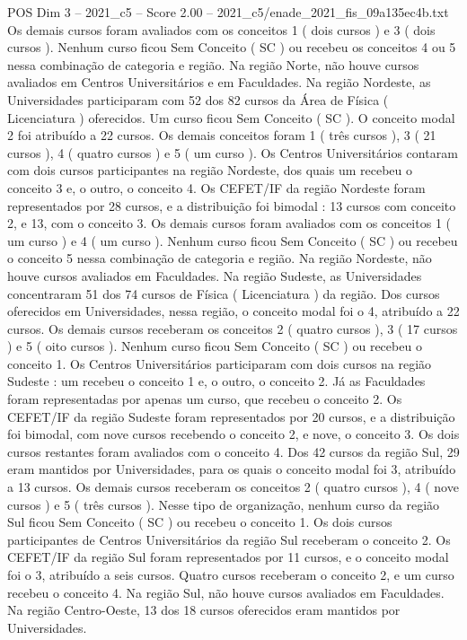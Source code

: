 \begin{textsample}{POS Dim 3 – 2021\_c5 – Score 2.00 – 2021\_c5/enade\_2021\_fis\_09a135ec4b.txt}
Os demais cursos foram avaliados com os conceitos 1 ( dois cursos ) e 3 ( dois cursos ).
Nenhum curso ficou Sem Conceito ( SC ) ou recebeu os conceitos 4 ou 5 nessa combinação de categoria e região.
Na região Norte, não houve cursos avaliados em Centros Universitários e em Faculdades.
Na região Nordeste, as Universidades participaram com 52 dos 82 cursos da Área de Física ( Licenciatura ) oferecidos.
Um curso ficou Sem Conceito ( SC ).
O conceito modal 2 foi atribuído a 22 cursos.
Os demais conceitos foram 1 ( três cursos ), 3 ( 21 cursos ), 4 ( quatro cursos ) e 5 ( um curso ).
Os Centros Universitários contaram com dois cursos participantes na região Nordeste, dos quais um recebeu o conceito 3 e, o outro, o conceito 4.
Os CEFET/IF da região Nordeste foram representados por 28 cursos, e a distribuição foi bimodal : 13 cursos com conceito 2, e 13, com o conceito 3.
Os demais cursos foram avaliados com os conceitos 1 ( um curso ) e 4 ( um curso ).
Nenhum curso ficou Sem Conceito ( SC ) ou recebeu o conceito 5 nessa combinação de categoria e região.
Na região Nordeste, não houve cursos avaliados em Faculdades.
Na região Sudeste, as Universidades concentraram 51 dos 74 cursos de Física ( Licenciatura ) da região.
Dos cursos oferecidos em Universidades, nessa região, o conceito modal foi o 4, atribuído a 22 cursos.
Os demais cursos receberam os conceitos 2 ( quatro cursos ), 3 ( 17 cursos ) e 5 ( oito cursos ).
Nenhum curso ficou Sem Conceito ( SC ) ou recebeu o conceito 1.
Os Centros Universitários participaram com dois cursos na região Sudeste : um recebeu o conceito 1 e, o outro, o conceito 2.
Já as Faculdades foram representadas por apenas um curso, que recebeu o conceito 2.
Os CEFET/IF da região Sudeste foram representados por 20 cursos, e a distribuição foi bimodal, com nove cursos recebendo o conceito 2, e nove, o conceito 3.
Os dois cursos restantes foram avaliados com o conceito 4.
Dos 42 cursos da região Sul, 29 eram mantidos por Universidades, para os quais o conceito modal foi 3, atribuído a 13 cursos.
Os demais cursos receberam os conceitos 2 ( quatro cursos ), 4 ( nove cursos ) e 5 ( três cursos ).
Nesse tipo de organização, nenhum curso da região Sul ficou Sem Conceito ( SC ) ou recebeu o conceito 1.
Os dois cursos participantes de Centros Universitários da região Sul receberam o conceito 2.
Os CEFET/IF da região Sul foram representados por 11 cursos, e o conceito modal foi o 3, atribuído a seis cursos.
Quatro cursos receberam o conceito 2, e um curso recebeu o conceito 4.
Na região Sul, não houve cursos avaliados em Faculdades.
Na região Centro-Oeste, 13 dos 18 cursos oferecidos eram mantidos por Universidades.

\end{textsample}
